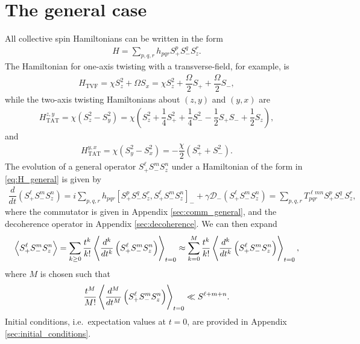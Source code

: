 \documentclass[aps,notitlepage,nofootinbib,11pt]{revtex4-1}
\renewcommand{\t}{\text} %
\newcommand{\f}[2]{\dfrac{#1}{#2}} %
\newcommand{\p}[1]{\left(#1\right)} %
\renewcommand{\sp}[1]{\left[#1\right]} %
\newcommand{\bk}{\Braket} %
\newcommand{\D}{\mathcal{D}}
\newcommand{\1}{\mathds{1}}
\begin{document}
\section{The general case}

All collective spin Hamiltonians can be written in the form
\begin{align}
  H = \sum_{p,q,r} h_{pqr} S_+^p S_-^q S_z^r.
  \label{eq:H_general}
\end{align}
The Hamiltonian for one-axis twisting with a transverse-field, for
example, is
\begin{align}
  H_{\t{TVF}}
  = \chi S_z^2 + \Omega S_x
  = \chi S_z^2 + \f{\Omega}{2} S_+ + \f{\Omega}{2} S_-,
\end{align}
while the two-axis twisting Hamiltonians about $\p{z,y}$ and $\p{y,x}$
are
\begin{align}
  H_{\t{TAT}}^{z,y}
  = \chi \p{S_z^2 - S_y^2}
  = \chi \p{S_z^2 + \f14 S_+^2 + \f14 S_-^2 - \f12 S_+ S_- + \f12 S_z},
\end{align}
and
\begin{align}
  H_{\t{TAT}}^{y,x}
  = \chi\p{S_y^2 - S_x^2}
  = -\f{\chi}{2} \p{S_+^2 + S_-^2}.
\end{align}
The evolution of a general operator $S_+^\ell S_-^m S_z^n$ under a
Hamiltonian of the form in \eqref{eq:H_general} is given by
\begin{align}
  \f{d}{dt} \p{S_+^\ell S_-^m S_z^n}
  = i\sum_{p,q,r} h_{pqr} \sp{S_+^p S_-^q S_z^r, S_+^\ell S_-^m S_z^n}_-
  + \gamma \D_-\p{S_+^\ell S_-^m S_z^n}
  = \sum_{p,q,r} T^{\ell m n}_{pqr} S_+^p S_-^q S_z^r,
\end{align}
where the commutator is given in Appendix \ref{sec:comm_general}, and
the decoherence operator in Appendix \ref{sec:decoherence}.  We can
then expand
\begin{align}
  \bk{S_+^\ell S_-^m S_z^n}
  = \sum_{k\ge0} \f{t^k}{k!}
  \bk{\f{d^k}{dt^k}\p{S_+^\ell S_-^m S_z^n}}_{t=0}
  \approx \sum_{k=0}^M \f{t^k}{k!}
  \bk{\f{d^k}{dt^k}\p{S_+^\ell S_-^m S_z^n}}_{t=0},
\end{align}
where $M$ is chosen such that
\begin{align}
  \f{t^M}{M!} \bk{\f{d^M}{dt^M}\p{S_+^\ell S_-^m S_z^n}}_{t=0}
  \ll S^{\ell+m+n}.
\end{align}
Initial conditions, i.e.~expectation values at $t=0$, are provided in
Appendix \ref{sec:initial_conditions}.




\newpage
\appendix
\end{document}
